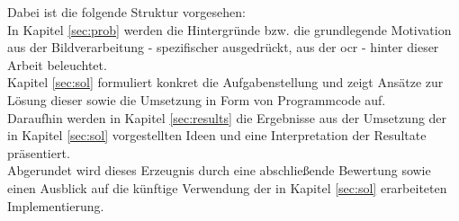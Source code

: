 	Dabei ist die folgende Struktur vorgesehen: \\
	In Kapitel \ref{sec:prob} werden die Hintergründe bzw. die grundlegende 
	Motivation aus der Bildverarbeitung - spezifischer ausgedrückt, aus der 
	\gls{ocr} - hinter dieser Arbeit beleuchtet.\\
	Kapitel \ref{sec:sol} formuliert konkret die Aufgabenstellung und zeigt Ansätze 
	zur Lösung dieser sowie die Umsetzung in Form von Programmcode auf.\\
	Daraufhin werden in Kapitel \ref{sec:results} die Ergebnisse aus der 
	Umsetzung der in Kapitel \ref{sec:sol} vorgestellten Ideen und eine 
	Interpretation der Resultate präsentiert.\\
	Abgerundet wird dieses Erzeugnis durch eine abschließende Bewertung sowie einen Ausblick auf die künftige Verwendung der in Kapitel \ref{sec:sol} erarbeiteten Implementierung.
